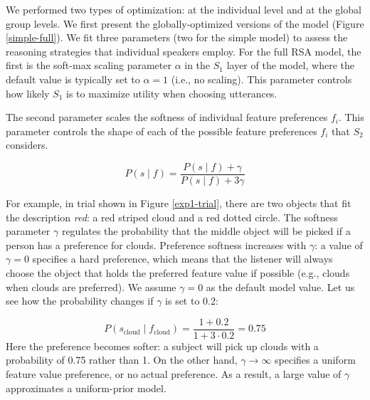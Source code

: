 \documentclass[10pt,a4paper]{article}
\begin{document}
We performed two types of optimization: at the individual level and at the global group levels. We first present the globally-optimized versions of the model (Figure \ref{simple-full}). We fit three parameters (two for the simple model) to assess the reasoning strategies that individual speakers employ.
For the full RSA model, the first is the soft-max scaling parameter $\alpha$ in the $S_1$ layer of the model, where the default value is typically set to $\alpha=1$ (i.e., no scaling). 
This parameter controls how likely $S_1$ is to maximize utility when choosing utterances. 

The second parameter scales the softness of individual feature preferences $f_i$. This parameter controls the shape of each of the possible feature preferences $f_i$ that $S_2$ considers. 

$$ P(s\mid f) = \frac{P(s\mid f) + \gamma}{P(s\mid f) + 3\gamma}$$



 
 For example, in trial shown in Figure \ref{exp1-trial}, there are two objects that fit the description \textit{red}: a red striped cloud and a red dotted circle. The softness parameter $\gamma$ regulates the probability that the middle object will be picked if a person has a preference for clouds. Preference softness increases with $\gamma$: 
 a value of $\gamma=0$ specifies a hard preference, which means that the listener will always choose the object that holds the preferred feature value if possible (e.g., clouds when clouds are preferred). 
 We assume $\gamma=0$ as the default model value. Let us see how the probability changes if $\gamma$ is set to 0.2:
 
 $$ P(s_{\textrm{cloud}}\mid f_{\textrm{cloud}}) = \frac{1 + 0.2}{1 + 3 \cdot 0.2} = 0.75$$
 Here the preference becomes softer: a subject will pick up clouds with a probability of 0.75 rather than 1.
 On the other hand, $\gamma \rightarrow \infty$ specifies a uniform feature value preference, or no actual preference. As a result, a large value of $\gamma$ approximates a uniform-prior model.
\end{document}
